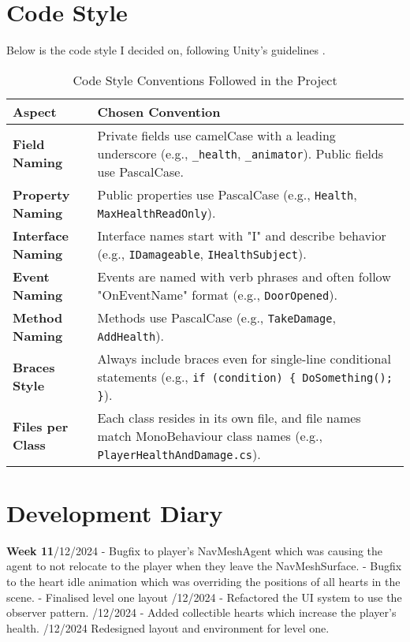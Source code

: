 \documentclass[10pt]{final_report}
\begin{document}
\section{Code Style}
Below is the code style I decided on, following Unity's guidelines \cite{unity_2022_codestyle}.
\begin{table}[H]
\centering
\begin{tabular}{|p{4cm}|p{8cm}|}
\hline
\textbf{Aspect}              & \textbf{Chosen Convention}                                                                                   \\ \hline
\textbf{Field Naming}        & Private fields use camelCase with a leading underscore (e.g., \texttt{\_health}, \texttt{\_animator}). Public fields use PascalCase. \\ \hline
\textbf{Property Naming}     & Public properties use PascalCase (e.g., \texttt{Health}, \texttt{MaxHealthReadOnly}).                         \\ \hline
\textbf{Interface Naming}    & Interface names start with "I" and describe behavior (e.g., \texttt{IDamageable}, \texttt{IHealthSubject}).   \\ \hline
\textbf{Event Naming}        & Events are named with verb phrases and often follow "OnEventName" format (e.g., \texttt{DoorOpened}).         \\ \hline
\textbf{Method Naming}       & Methods use  PascalCase (e.g., \texttt{TakeDamage}, \texttt{AddHealth}).                    \\ \hline
\textbf{Braces Style}        & Always include braces even for single-line conditional statements (e.g., \texttt{if (condition) \{ DoSomething(); \}}). \\ \hline
\textbf{Files per Class}     & Each class resides in its own file, and file names match MonoBehaviour class names (e.g., \texttt{PlayerHealthAndDamage.cs}). \\ \hline
\end{tabular}
\caption{Code Style Conventions Followed in the Project}
\label{tab:codestyle}
\end{table}

\section{Development Diary}
\textbf{Week 11}/12/2024
\newline- Bugfix to player's NavMeshAgent which was causing the agent to not relocate to the player when they leave the NavMeshSurface.
\newline- Bugfix to the heart idle animation which was overriding the positions of all hearts in the scene.
\newline- Finalised level one layout
/12/2024
\newline- Refactored the UI system to use the observer pattern.
/12/2024
\newline- Added collectible hearts which increase the player's health.
/12/2024
\newline Redesigned layout and environment for level one.
\end{document}
